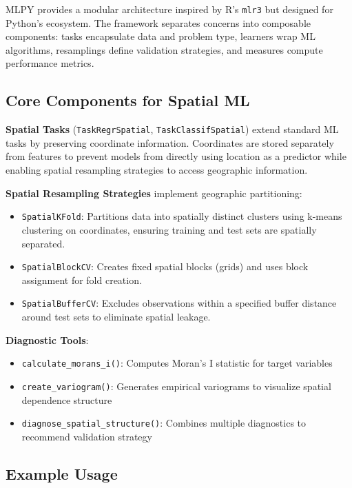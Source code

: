 \documentclass[a4paper,fleqn]{cas-sc}
\begin{document}
MLPY provides a modular architecture inspired by R's \texttt{mlr3} \citep{lang2019mlr3} but designed for Python's ecosystem. The framework separates concerns into composable components: tasks encapsulate data and problem type, learners wrap ML algorithms, resamplings define validation strategies, and measures compute performance metrics.

\subsection{Core Components for Spatial ML}

\textbf{Spatial Tasks} (\texttt{TaskRegrSpatial}, \texttt{TaskClassifSpatial}) extend standard ML tasks by preserving coordinate information. Coordinates are stored separately from features to prevent models from directly using location as a predictor while enabling spatial resampling strategies to access geographic information.

\textbf{Spatial Resampling Strategies} implement geographic partitioning:
\begin{itemize}
\item \texttt{SpatialKFold}: Partitions data into spatially distinct clusters using k-means clustering on coordinates, ensuring training and test sets are spatially separated.
\item \texttt{SpatialBlockCV}: Creates fixed spatial blocks (grids) and uses block assignment for fold creation.
\item \texttt{SpatialBufferCV}: Excludes observations within a specified buffer distance around test sets to eliminate spatial leakage.
\end{itemize}

\textbf{Diagnostic Tools}:
\begin{itemize}
\item \texttt{calculate\_morans\_i()}: Computes Moran's I statistic for target variables
\item \texttt{create\_variogram()}: Generates empirical variograms to visualize spatial dependence structure
\item \texttt{diagnose\_spatial\_structure()}: Combines multiple diagnostics to recommend validation strategy
\end{itemize}

\subsection{Example Usage}
\end{document}
